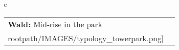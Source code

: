 \begin{table}[H]
        \begin{tabular}{c}
        \begin{tabular}{m{1.5in} m{2in}}
\textbf{Wald:} {Mid-rise in the park} & \texttt{[image: \\rootpath/IMAGES/typology\_towerpark.png]}
\end{tabular}\end{tabular}
        \end{table}